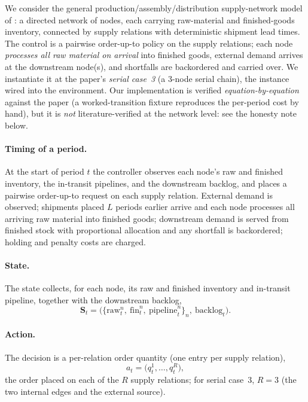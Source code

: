 \documentclass[11pt]{article}
\begin{document}
We consider the general production/assembly/distribution supply-network model of
\citet{pirhooshyaran2021scn}: a directed network of nodes, each carrying raw-material and
finished-goods inventory, connected by supply relations with deterministic shipment lead times. The
control is a pairwise order-up-to policy on the supply relations; each node \emph{processes all raw
material on arrival} into finished goods, external demand arrives at the downstream node(s), and
shortfalls are backordered and carried over. We instantiate it at the paper's \emph{serial case~3}
(a 3-node serial chain), the instance wired into the environment. Our implementation is verified
\emph{equation-by-equation} against the paper (a worked-transition fixture reproduces
the per-period cost by hand), but it is \emph{not} literature-verified at the network level: see the
honesty note below.

\paragraph{Timing of a period.}
At the start of period $t$ the controller observes each node's raw and finished inventory, the
in-transit pipelines, and the downstream backlog, and places a pairwise order-up-to request on each
supply relation. External demand is observed; shipments placed $L$ periods earlier arrive and each
node processes all arriving raw material into finished goods; downstream demand is served from finished
stock with proportional allocation and any shortfall is backordered; holding and penalty costs are
charged.

\paragraph{State.}
The state collects, for each node, its raw and finished inventory and in-transit pipeline, together
with the downstream backlog,
\begin{equation*}
    \mathbf{S}_t=\bigl(\{\text{raw}^{n}_t,\ \text{fin}^{n}_t,\ \text{pipeline}^{n}_t\}_{n},\ \text{backlog}_t\bigr).
\end{equation*}

\paragraph{Action.}
The decision is a per-relation order quantity (one entry per supply relation),
\begin{equation*}
    a_t=\bigl(q^{1}_t,\dots,q^{R}_t\bigr),
\end{equation*}
the order placed on each of the $R$ supply relations; for serial case~3, $R=3$ (the two internal edges
and the external source).
\end{document}
